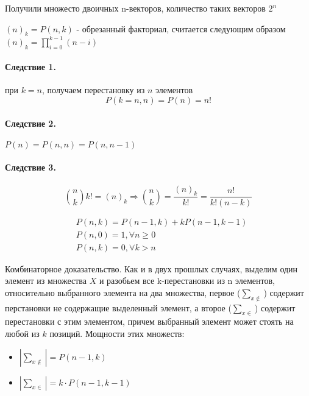 Получили множесто двоичных n-векторов, количество таких векторов $2^n$

\begin{Def}
${\left(n\right)}_k = P\left(n,k\right)$ - обрезанный факториал, считается следующим образом ${\left(n\right)}_k = \prod_{i=0}^{k-1} \left(n-i\right)$
\end{Def}

\paragraph{Следствие 1.} при $k=n$, получаем перестановку из $n$ элементов
\[
	P\left(k=n,n\right) = P\left(n\right) = n!
\]

\paragraph{Следствие 2.} $P\left(n\right) = P \left(n, n\right) = P\left(n,n-1\right)$

\paragraph{Следствие 3.}
\[
	\binom{n}{k} k! = {\left(n\right)}_k \Rightarrow \binom{n}{k} = \frac{{\left(n\right)}_k}{k!} = \frac{n!}{k!\left(n-k\right)}
\]

\begin{Th}
\[
	\begin{split}
		& P\left(n,k\right) = P\left(n-1,k\right)+k P\left(n-1,k-1\right)\\
		& P\left(n,0\right) = 1, \forall n \ge 0 \\
		& P\left(n,k\right) = 0, \forall k > n
	\end{split}
\]
\end{Th}

\begin{Proof}
Комбинаторное доказательство. Как и в двух прошлых случаях, выделим один элемент из множества $X$ и разобьем все k-перестановки из n элементов, относительно выбранного элемента на два множества, первое ($\sum_{x \notin}$) содержит перстановки не содержащие выделенный элемент, а второе ($\sum_{x \in}$) содержит перестановки с этим элементом, причем выбранный элемент может стоять на любой из $k$ позиций. Мощности этих множеств:
\begin{itemize}
	\item $\left|\sum_{x \not\in}\right| = P\left(n-1,k\right)$

	\item $\left|\sum_{x \in}\right| = k \cdot P\left(n-1, k-1\right)$
\end{itemize}
\end{Proof}

